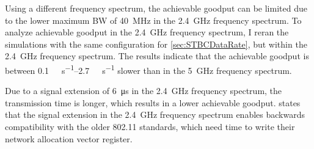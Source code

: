 Using a different frequency spectrum, the achievable goodput can be limited due to the lower maximum \ac{BW} of \SI{40}{\mega\hertz} in the \SI{2.4}{\giga\hertz} frequency spectrum.
To analyze achievable goodput in the \SI{2.4}{\giga\hertz} frequency spectrum, I reran the simulations with the same configuration for \autoref{sec:STBCDataRate}, but within the \SI{2.4}{\giga\hertz} frequency spectrum.
The results indicate that the achievable goodput is between \SIrange{0.1}{2.7}{\mega\bit\per\second} slower than in the \SI{5}{\giga\hertz} frequency spectrum.

Due to a signal extension of \SI{6}{\micro\second} in the \SI{2.4}{\giga\hertz} frequency spectrum, the transmission time is longer, which results in a lower achievable goodput.
\cite{ieee_standard_2009n} states that the signal extension in the \SI{2.4}{\giga\hertz} frequency spectrum enables
backwards compatibility with the older 802.11 standards, which need time to write their network allocation vector register.


